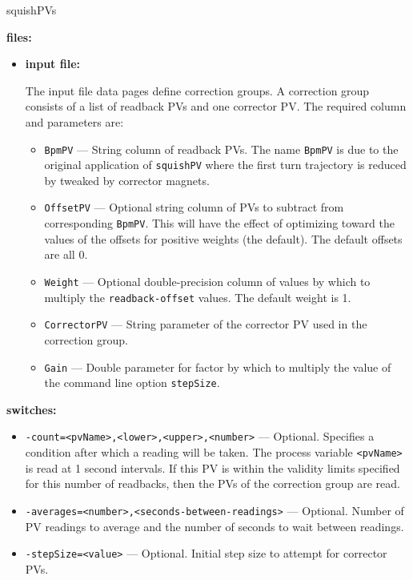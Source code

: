 \begin{sddsprog}{squishPVs}
\item {\bf files:}
\begin{itemize}
\item {\bf input file:}\par
The input file data pages define correction groups. A correction group
consists of a list of readback PVs and one corrector PV. The required column and parameters are:
\begin{itemize}
        \item {\tt BpmPV} --- String column of readback PVs. The name \verb+BpmPV+ is due
                to the original application of \verb+squishPV+ where the first turn
                trajectory is reduced by tweaked by corrector magnets.
        \item {\tt OffsetPV} --- Optional string column of PVs to subtract from corresponding \verb+BpmPV+.
                This will have the effect of optimizing toward the values of the offsets for
                positive weights (the default).  The default offsets are all 0.
        \item {\tt Weight} --- Optional double-precision column of values by which to multiply the
                \verb+readback-offset+ values.  The default weight is 1.
        \item {\tt CorrectorPV} --- String parameter of the corrector PV used in the correction group.
        \item {\tt Gain} --- Double parameter for factor by which to multiply the
                value of the command line option \verb+stepSize+.
\end{itemize}
\end{itemize}
%
\item {\bf switches:}
%
%
    \begin{itemize}
      \item {\tt -count=<pvName>,<lower>,<upper>,<number>} --- Optional. Specifies
                a condition after which a reading will be taken. The process variable
                \verb+<pvName>+ is read at 1 second intervals. If this
                PV is within the validity limits specified for this number of readbacks, then
                the PVs of the correction group are read.                
        \item {\tt -averages=<number>,<seconds-between-readings>} --- Optional. Number of PV readings to average
                and the number of seconds to wait between readings.
        \item {\tt -stepSize=<value>} --- Optional. Initial step size to attempt for corrector PVs.

\end{itemize}
\end{sddsprog}
